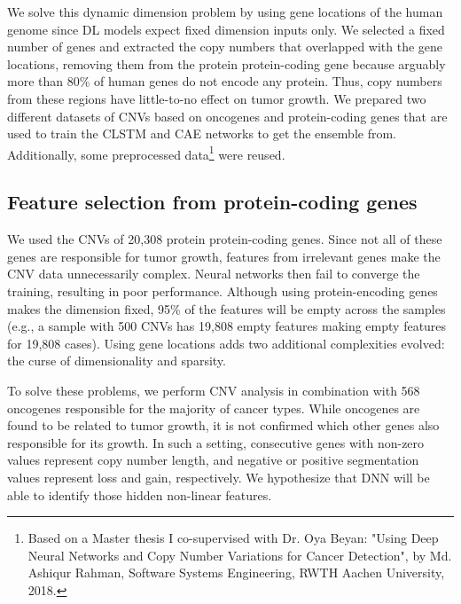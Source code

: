 \hspace*{3.5mm} We solve this dynamic dimension problem by using gene locations of the human genome since DL models expect fixed dimension inputs only. We selected a fixed number of genes and extracted the copy numbers that overlapped with the gene locations, removing them from the protein protein-coding gene because arguably more than 80\% of human genes do not encode any protein. Thus, copy numbers from these regions have little-to-no effect on tumor growth. %
We prepared two different datasets of CNVs based on oncogenes and protein-coding genes that are used to train the CLSTM and CAE networks to get the ensemble from. Additionally, some preprocessed data\footnote{Based on a Master thesis I co-supervised with Dr. Oya Beyan: "Using Deep Neural Networks and Copy Number Variations for Cancer Detection", by Md. Ashiqur Rahman, Software Systems Engineering, RWTH Aachen University, 2018.} were reused. %

\subsection{Feature selection from protein-coding genes}
We used the CNVs of 20,308 protein protein-coding genes. Since not all of these genes are responsible for tumor growth, features from irrelevant genes make the CNV data unnecessarily complex. Neural networks then fail to converge the training, resulting in poor performance. Although using protein-encoding genes makes the dimension fixed, 95\% of the features will be empty across the samples (e.g., a sample with 500 CNVs has 19,808 empty features making empty features for 19,808 cases). Using gene locations adds two additional complexities evolved: the curse of dimensionality and sparsity. 

\hspace*{3.5mm} To solve these problems, we perform CNV analysis in combination with 568 oncogenes responsible for the majority of cancer types. While oncogenes are found to be related to tumor growth, it is not confirmed which other genes also responsible for its growth. In such a setting, consecutive genes with non-zero values represent copy number length, and negative or positive segmentation values represent loss and gain, respectively. We hypothesize that DNN will be able to identify those hidden non-linear features. 

